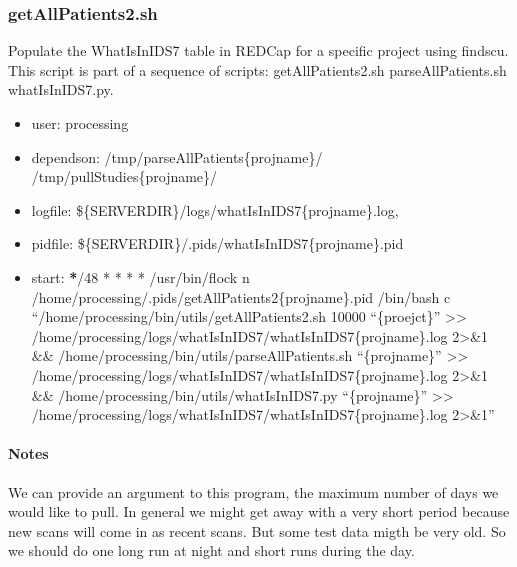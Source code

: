 \documentclass[letterpaper,10pt,english]{sphinxmanual}
\begin{document}
\subsubsection{getAllPatients2.sh}
\label{\detokenize{Architecture/scripts/getAllPatients2:getallpatients2-sh}}\label{\detokenize{Architecture/scripts/getAllPatients2::doc}}
\sphinxAtStartPar
Populate the WhatIsInIDS7 table in REDCap for a specific project using findscu. This script is part of a sequence of scripts: getAllPatients2.sh \sphinxhyphen{} parseAllPatients.sh \sphinxhyphen{} whatIsInIDS7.py.
\begin{itemize}
\item {} 
\sphinxAtStartPar
user: processing

\item {} 
\sphinxAtStartPar
depends\sphinxhyphen{}on:
\sphinxhyphen{} /tmp/parseAllPatients\{projname\}/
\sphinxhyphen{} /tmp/pullStudies\{projname\}/

\item {} 
\sphinxAtStartPar
log\sphinxhyphen{}file:
\sphinxhyphen{} \$\{SERVERDIR\}/logs/whatIsInIDS7\{projname\}.log,

\item {} 
\sphinxAtStartPar
pid\sphinxhyphen{}file: \$\{SERVERDIR\}/.pids/whatIsInIDS7\{projname\}.pid

\item {} 
\sphinxAtStartPar
start:
{\color{red}\bfseries{}*}/48 * * * * /usr/bin/flock \sphinxhyphen{}n /home/processing/.pids/getAllPatients2\{projname\}.pid /bin/bash \sphinxhyphen{}c “/home/processing/bin/utils/getAllPatients2.sh 10000 “\{proejct\}” \textgreater{}\textgreater{} /home/processing/logs/whatIsInIDS7/whatIsInIDS7\{projname\}.log 2\textgreater{}\&1 \&\& /home/processing/bin/utils/parseAllPatients.sh “\{projname\}” \textgreater{}\textgreater{} /home/processing/logs/whatIsInIDS7/whatIsInIDS7\{projname\}.log 2\textgreater{}\&1 \&\& /home/processing/bin/utils/whatIsInIDS7.py “\{projname\}” \textgreater{}\textgreater{} /home/processing/logs/whatIsInIDS7/whatIsInIDS7\{projname\}.log 2\textgreater{}\&1”

\end{itemize}


\paragraph{Notes}
\label{\detokenize{Architecture/scripts/getAllPatients2:notes}}
\sphinxAtStartPar
We can provide an argument to this program, the maximum number of days we would like to pull. In general we might get away with a very short period because new scans will come in as recent scans. But some test data migth be very old. So we should do one long run at night and short runs during the day.
\end{document}
